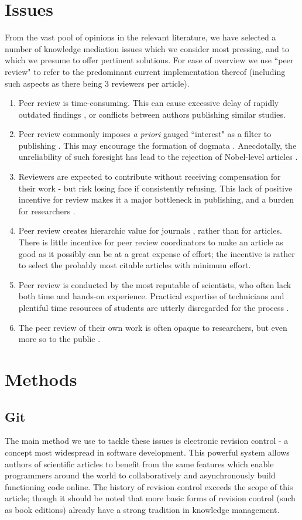 \section{Issues}
From the vast pool of opinions in the relevant literature, we have selected a number of knowledge mediation issues which we consider most pressing, and to which we presume to offer pertinent solutions. For ease of overview we use ``peer review" to refer to the predominant current implementation thereof (including such aspects as there being 3 reviewers per article).
\begin{enumerate}
	\item Peer review is time-consuming.
	This can cause excessive delay of rapidly outdated findings \cite{Riley2006}, or conflicts between authors publishing similar studies.
	\item Peer review commonly imposes \textit{a priori} gauged ``interest" as a filter to publishing \cite{Bloom2006}. 
	This may encourage the formation of dogmata \cite{Akerman2006}. 
	Anecdotally, the unreliability of such foresight has lead to the rejection of Nobel-level articles \cite{Nature2003}.
	\item Reviewers are expected to contribute without receiving compensation for their work - but risk losing face if consistently refusing.
	This lack of positive incentive for review makes it a major bottleneck in publishing, and a burden for researchers \cite{Koop2006}.
	\item Peer review creates hierarchic value for journals \cite{Jennings2006,Wager2006}, rather than for articles. 
	There is little incentive for peer review coordinators to make an article as good as it possibly can be at a great expense of effort;
	the incentive is rather to select the probably most citable articles with minimum effort.
	\item Peer review is conducted by the most reputable of scientists, who often lack both time and hands-on experience.
	Practical expertise of technicians and plentiful time resources of students are utterly disregarded for the process \cite{Lahiri2006}.
	\item The peer review of their own work is often opaque to researchers, but even more so to the public \cite{Brown2006}.
\end{enumerate}
\section{Methods}
\subsection{Git}
The main method we use to tackle these issues is electronic revision control - a concept most widespread in software development.
This powerful system allows authors of scientific articles to benefit from the same features which enable programmers around the world to collaboratively and asynchronously build functioning code online. 
The history of revision control exceeds the scope of this article; though it should be noted that more basic forms of revision control (such as book editions) already have a strong tradition in knowledge management.

